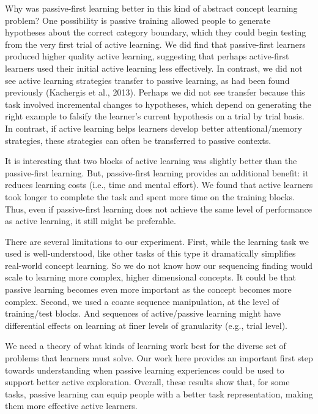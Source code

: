 \documentclass[10pt, letterpaper]{article}
\begin{document}
Why was passive-first learning better in this kind of abstract concept
learning problem? One possibility is passive training allowed people to
generate hypotheses about the correct category boundary, which they
could begin testing from the very first trial of active learning. We did
find that passive-first learners produced higher quality active
learning, suggesting that perhaps active-first learners used their
initial active learning less effectively. In contrast, we did not see
active learning strategies transfer to passive learning, as had been
found previously (Kachergis et al., 2013). Perhaps we did not see
transfer because this task involved incremental changes to hypotheses,
which depend on generating the right example to falsify the learner's
current hypothesis on a trial by trial basis. In contrast, if active
learning helps learners develop better attentional/memory strategies,
these strategies can often be transferred to passive contexts.

It is interesting that two blocks of active learning was slightly better
than the passive-first learning. But, passive-first learning provides an
additional benefit: it reduces learning costs (i.e., time and mental
effort). We found that active learners took longer to complete the task
and spent more time on the training blocks. Thus, even if passive-first
learning does not achieve the same level of performance as active
learning, it still might be preferable.

There are several limitations to our experiment. First, while the
learning task we used is well-understood, like other tasks of this type
it dramatically simplifies real-world concept learning. So we do not
know how our sequencing finding would scale to learning more complex,
higher dimensional concepts. It could be that passive learning becomes
even more important as the concept becomes more complex. Second, we used
a coarse sequence manipulation, at the level of training/test blocks.
And sequences of active/passive learning might have differential effects
on learning at finer levels of granularity (e.g., trial level).

We need a theory of what kinds of learning work best for the diverse set
of problems that learners must solve. Our work here provides an
important first step towards understanding when passive learning
experiences could be used to support better active exploration. Overall,
these results show that, for some tasks, passive learning can equip
people with a better task representation, making them more effective
active learners.
\end{document}
